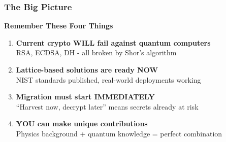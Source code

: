 \documentclass[aspectratio=169,10pt]{beamer}
\newcommand{\teaching}[1]{}
\newcommand{\slideheader}[1]{\frametitle{#1}}
\theoremstyle{plain}
\begin{document}
\begin{frame}
  \slideheader{The Big Picture}
  
  \begin{center}
    \textbf{\Huge Remember These Four Things}
  \end{center}
  
  \vspace{1cm}
  
  \begin{enumerate}
    \item \begin{redBox}
      \textbf{Current crypto WILL fail against quantum computers}\\
      RSA, ECDSA, DH - all broken by Shor's algorithm
    \end{redBox}
    
    \vspace{0.5cm}
    
    \item \begin{greenBox}
      \textbf{Lattice-based solutions are ready NOW}\\
      NIST standards published, real-world deployments working
    \end{greenBox}
    
    \vspace{0.5cm}
    
    \item \begin{blueBox}
      \textbf{Migration must start IMMEDIATELY}\\
      ``Harvest now, decrypt later'' means secrets already at risk
    \end{blueBox}
    
    \vspace{0.5cm}
    
    \item \begin{yellowBox}
      \textbf{YOU can make unique contributions}\\
      Physics background + quantum knowledge = perfect combination
    \end{yellowBox}
  \end{enumerate}
  
  \teaching{Reinforce the four key messages}
\end{frame}
\end{document}
